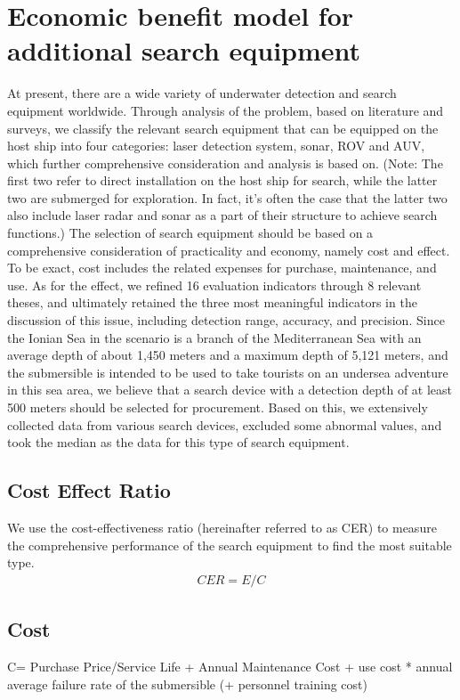 \documentclass[12pt]{article}  %
\begin{document}
\section{Economic benefit model for additional search equipment}
\indent At present, there are a wide variety of underwater detection and search equipment worldwide. Through analysis of the problem, based on literature and surveys, we classify the relevant search equipment that can be equipped on the host ship into four categories: laser detection system, sonar, ROV and AUV, which further comprehensive consideration and analysis is based on. (Note: The first two refer to direct installation on the host ship for search, while the latter two are submerged for exploration. In fact, it’s often the case that the latter two also include laser radar and sonar as a part of their structure to achieve search functions.)
The selection of search equipment should be based on a comprehensive consideration of practicality and economy, namely cost and effect. To be exact, cost includes the related expenses for purchase, maintenance, and use. As for the effect, we refined 16 evaluation indicators through 8 relevant theses, and ultimately retained the three most meaningful indicators in the discussion of this issue, including detection range, accuracy, and precision.
Since the Ionian Sea in the scenario is a branch of the Mediterranean Sea with an average depth of about 1,450 meters and a maximum depth of 5,121 meters, and the submersible is intended to be used to take tourists on an undersea adventure in this sea area, we believe that a search device with a detection depth of at least 500 meters should be selected for procurement. Based on this, we extensively collected data from various search devices, excluded some abnormal values, and took the median as the data for this type of search equipment.
\subsection{Cost Effect Ratio}
\indent We use the cost-effectiveness ratio (hereinafter referred to as CER) to measure the comprehensive performance of the search equipment to find the most suitable type.
\begin{equation}
    \begin{aligned}
     CER =  {E/C} 
     \end{aligned}
    \end{equation}
\subsection{Cost}
\indent C= Purchase Price/Service Life + Annual Maintenance Cost + use cost * annual average failure rate of the submersible (+ personnel training cost)
\end{document}

